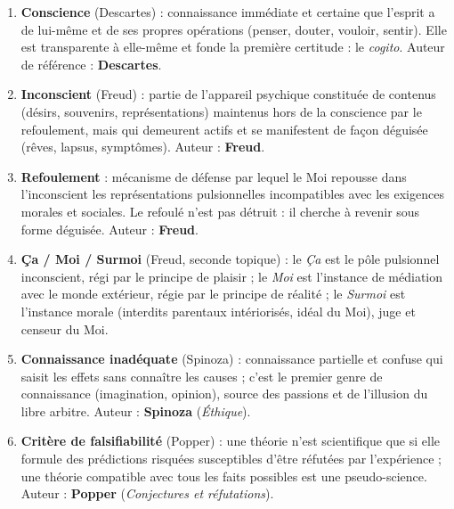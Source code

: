 \documentclass[11pt]{article}
\begin{document}
\begin{corrige}
\begin{enumerate}
\item \textbf{Conscience} (Descartes) : connaissance immédiate et certaine que l'esprit a de lui-même et de ses propres opérations (penser, douter, vouloir, sentir). Elle est transparente à elle-même et fonde la première certitude : le \emph{cogito}. Auteur de référence : \textbf{Descartes}.
\item \textbf{Inconscient} (Freud) : partie de l'appareil psychique constituée de contenus (désirs, souvenirs, représentations) maintenus hors de la conscience par le refoulement, mais qui demeurent actifs et se manifestent de façon déguisée (rêves, lapsus, symptômes). Auteur : \textbf{Freud}.
\item \textbf{Refoulement} : mécanisme de défense par lequel le Moi repousse dans l'inconscient les représentations pulsionnelles incompatibles avec les exigences morales et sociales. Le refoulé n'est pas détruit : il cherche à revenir sous forme déguisée. Auteur : \textbf{Freud}.
\item \textbf{Ça / Moi / Surmoi} (Freud, seconde topique) : le \emph{Ça} est le pôle pulsionnel inconscient, régi par le principe de plaisir ; le \emph{Moi} est l'instance de médiation avec le monde extérieur, régie par le principe de réalité ; le \emph{Surmoi} est l'instance morale (interdits parentaux intériorisés, idéal du Moi), juge et censeur du Moi.
\item \textbf{Connaissance inadéquate} (Spinoza) : connaissance partielle et confuse qui saisit les effets sans connaître les causes ; c'est le premier genre de connaissance (imagination, opinion), source des passions et de l'illusion du libre arbitre. Auteur : \textbf{Spinoza} (\emph{Éthique}).
\item \textbf{Critère de falsifiabilité} (Popper) : une théorie n'est scientifique que si elle formule des prédictions risquées susceptibles d'être réfutées par l'expérience ; une théorie compatible avec tous les faits possibles est une pseudo-science. Auteur : \textbf{Popper} (\emph{Conjectures et réfutations}).
\end{enumerate}
\end{corrige}
\end{document}
